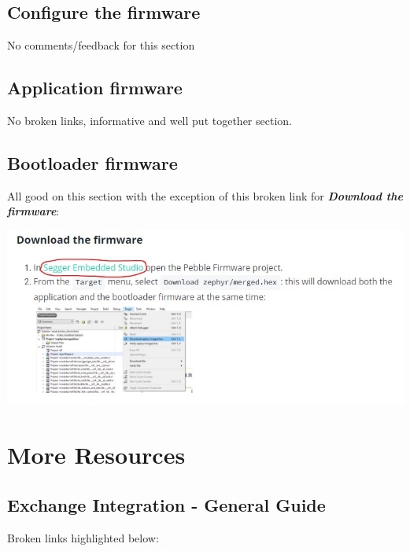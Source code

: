 \documentclass[
]{book}
\begin{document}
\hypertarget{configure-the-firmware}{%
\section{Configure the firmware}\label{configure-the-firmware}}

No comments/feedback for this section

\hypertarget{application-firmware}{%
\section{Application firmware}\label{application-firmware}}

No broken links, informative and well put together section.

\hypertarget{bootloader-firmware}{%
\section{Bootloader firmware}\label{bootloader-firmware}}

All good on this section with the exception of this broken link for
\textbf{\emph{Download the firmware}}:

\includegraphics{images/download_firmware_link.jpg}

\hypertarget{more-resources}{%
\chapter{More Resources}\label{more-resources}}

\hypertarget{exchange-integration---general-guide}{%
\section{Exchange Integration - General
Guide}\label{exchange-integration---general-guide}}

Broken links highlighted below:
\end{document}
